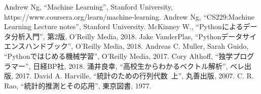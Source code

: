 \begin{thebibliography}{99}
 Andrew Ng, ``Machine Learning'', Stanford University, https://www.coursera.org/learn/machine-learning.
 Andrew Ng, ``CS229:Machine Learning Lecture notes'', Stanford University.
 McKinney W., ``Pythonによるデータ分析入門'', 第2版, O'Reilly Media, 2018.
 Jake VanderPlas, ``Pythonデータサイエンスハンドブック'', O'Reilly Media, 2018.
 Andreas C. Muller, Sarah Guido, ``Pythonではじめる機械学習'', O'Reilly Media, 2017.
 Cory Althoff, ``独学プログラマー'', 日経BP社, 2018.
 涌井良幸, ``高校生からわかるベクトル解析'', ベレ出版, 2017.
 David A. Harville, ``統計のための行列代数~上'', 丸善出版, 2007.
 C. R. Rao, ``統計的推測とその応用'', 東京図書, 1977.
\end{thebibliography}
